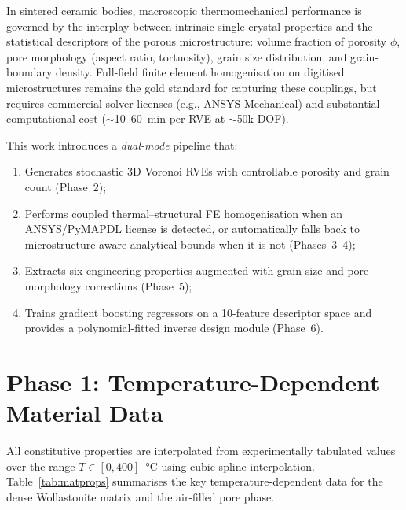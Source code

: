 \documentclass[11pt,a4paper]{article}
\begin{document}
In sintered ceramic bodies, macroscopic thermomechanical performance is governed by the interplay between intrinsic single-crystal properties and the statistical descriptors of the porous microstructure: volume fraction of porosity $\phi$, pore morphology (aspect ratio, tortuosity), grain size distribution, and grain-boundary density. Full-field finite element homogenisation on digitised microstructures remains the gold standard for capturing these couplings, but requires commercial solver licenses (e.g., ANSYS Mechanical) and substantial computational cost ($\sim$10--60~min per RVE at $\sim$50k DOF).

This work introduces a \emph{dual-mode} pipeline that:
\begin{enumerate}
    \item Generates stochastic 3D Voronoi RVEs with controllable porosity and grain count (Phase~2);
    \item Performs coupled thermal--structural FE homogenisation when an ANSYS/PyMAPDL license is detected, or automatically falls back to microstructure-aware analytical bounds when it is not (Phases~3--4);
    \item Extracts six engineering properties augmented with grain-size and pore-morphology corrections (Phase~5);
    \item Trains gradient boosting regressors on a 10-feature descriptor space and provides a polynomial-fitted inverse design module (Phase~6).
\end{enumerate}

\section{Phase 1: Temperature-Dependent Material Data}
\label{sec:phase1}

All constitutive properties are interpolated from experimentally tabulated values over the range $T \in [0, 400]$~\si{\celsius} using cubic spline interpolation. Table~\ref{tab:matprops} summarises the key temperature-dependent data for the dense Wollastonite matrix and the air-filled pore phase.
\end{document}
